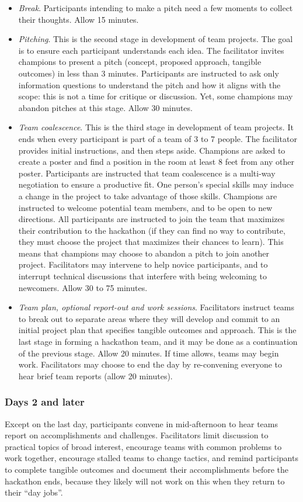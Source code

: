 \documentclass[11pt]{article}
\begin{document}
\begin{itemize}
\item	{\em Break}. Participants intending to make a pitch need a few moments to collect their thoughts. Allow 15 minutes. 
\item	{\em Pitching}. This is the second stage in development of team projects. The goal is to ensure each participant understands each idea. The facilitator invites champions to present a pitch (concept, proposed approach, tangible outcomes) in less than 3 minutes. Participants are instructed to ask only information questions to understand the pitch and how it aligns with the scope: this is not a time for critique or discussion.  Yet, some champions may abandon pitches at this stage. Allow 30 minutes.   
\item	{\em Team coalescence}. This is the third stage in development of team projects. It ends when every participant is part of a team of 3 to 7 people. The facilitator provides initial instructions, and then steps aside. Champions are asked to create a poster and find a position in the room at least 8 feet from any other poster. Participants are instructed that team coalescence is a multi-way negotiation to ensure a productive fit. One person’s special skills may induce a change in the project to take advantage of those skills. Champions are instructed to welcome potential team members, and to be open to new directions. All participants are instructed to join the team that maximizes their contribution to the hackathon (if they can find no way to contribute, they must choose the project that maximizes their chances to learn). This means that champions may choose to abandon a pitch to join another project. Facilitators may intervene to help novice participants, and to interrupt technical discussions that interfere with being welcoming to newcomers. Allow 30 to 75 minutes.  
\item	{\em Team plan, optional report-out and work sessions}. Facilitators instruct teams to break out to separate areas where they will develop and commit to an initial project plan that specifies tangible outcomes and approach. This is the last stage in forming a hackathon team, and it may be done as a continuation of the previous stage.  Allow 20 minutes. If time allows, teams may begin work. Facilitators may choose to end the day by re-convening everyone to hear brief team reports (allow 20 minutes). 
\end{itemize}
\subsubsection*{Days 2 and later} Except on the last day, participants convene in mid-afternoon to hear teams report on accomplishments and challenges. Facilitators limit discussion to practical topics of broad interest, encourage teams with common problems to work together, encourage stalled teams to change tactics, and remind participants to complete tangible outcomes and document their accomplishments before the hackathon ends, because they likely will not work on this when they return to their “day jobs”. 
\end{document}
